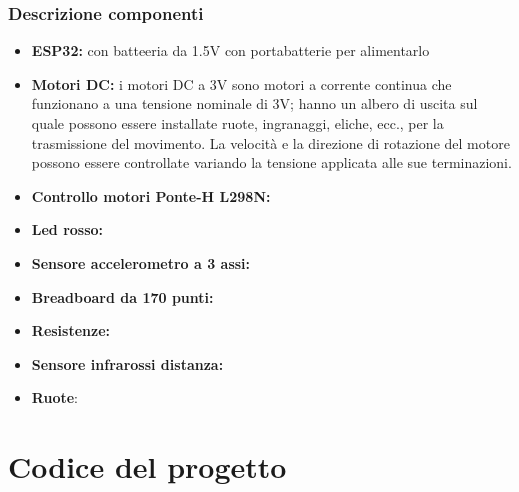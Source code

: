 \documentclass[a4paper]{book}
\begin{document}
	
	
	
	
	
	
	\subsection{Descrizione componenti}
	\begin{itemize} %
		\item \textbf{ESP32:} con batteeria da 1.5V con portabatterie per alimentarlo
		\item \textbf{Motori DC:} i motori DC a 3V sono motori a corrente continua che funzionano a una tensione nominale di 3V; hanno un albero di uscita sul quale possono essere installate ruote, ingranaggi, eliche, ecc., per la trasmissione del movimento. La velocità e la direzione di rotazione del motore possono essere controllate variando la tensione applicata alle sue terminazioni.
		\item \textbf{Controllo motori Ponte-H L298N:}
		\item \textbf{Led rosso:}
		\item \textbf{Sensore accelerometro a 3 assi:}
		\item \textbf{Breadboard da 170 punti:}
		\item \textbf{Resistenze:}
		\item \textbf{Sensore infrarossi distanza:}
		\item \textbf{Ruote}:
	\end{itemize}
	
	
	
	
		\chapter{Codice del progetto}
	
\end{document}
